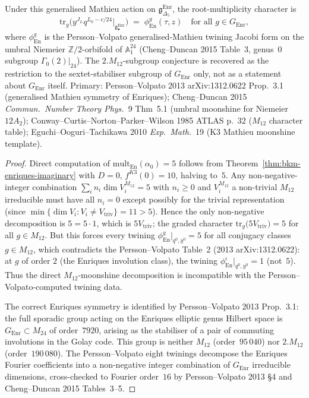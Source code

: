 \begin{theorem}
Under this generalised Mathieu action on
$\mathfrak{g}_{\Delta_5}^{\mathrm{Enr}}$,
the root-multiplicity character is
\[
 \mathrm{tr}_g\bigl(y^{J_L} q^{L_0 - c/24}\bigr|_{\mathfrak{g}^{\mathrm{Enr}}_\bullet}\bigr)
 \;=\;
 \phi^g_{\mathrm{En}}(\tau, z)
 \quad\text{for all } g\in G_{\mathrm{Enr}},
\]
where $\phi^g_{\mathrm{En}}$ is the Persson--Volpato generalised-Mathieu
twining Jacobi form on the umbral Niemeier $\mathbb{Z}/2$-orbifold
of $\mathbb{A}_1^{24}$ (Cheng--Duncan 2015 Table~3, genus~$0$
subgroup $\Gamma_0(2)|_{24}$). The $2.M_{12}$-subgroup conjecture
is recovered as the restriction to the sextet-stabiliser
subgroup of $G_{\mathrm{Enr}}$ only, not as a statement about
$G_{\mathrm{Enr}}$ itself.
Primary:
Persson--Volpato 2013 arXiv:1312.0622 Prop.~3.1
(generalised Mathieu symmetry of Enriques);
Cheng--Duncan 2015 \emph{Commun.~Number Theory Phys.}~9 Thm~5.1
(umbral moonshine for Niemeier $12A_2$);
Conway--Curtis--Norton--Parker--Wilson 1985 ATLAS p.~32
($M_{12}$ character table);
Eguchi--Ooguri--Tachikawa 2010 \emph{Exp.~Math.}~19
(K3 Mathieu moonshine template).
\end{theorem}

\begin{proof}[Proof]
Direct computation of $\mathrm{mult}_{\mathrm{En}}(\alpha_0) = 5$
follows from Theorem~\ref{thm:bkm-enriques-imaginary} with
$D = 0$, $f^{K3}(0) = 10$, halving to~$5$. Any
non-negative-integer combination $\sum_i n_i \dim V_i^{M_{12}} = 5$
with $n_i \geq 0$ and $V_i^{M_{12}}$ a non-trivial $M_{12}$
irreducible must have all $n_i = 0$ except possibly for the
trivial representation (since $\min\{\dim V_i : V_i \neq
V_{\mathrm{triv}}\} = 11 > 5$). Hence the only non-negative
decomposition is $5 = 5\cdot 1$, which is $5V_{\mathrm{triv}}$;
the graded character $\mathrm{tr}_g\bigl(5V_{\mathrm{triv}}\bigr)
= 5$ for all $g\in M_{12}$. But this forces every twining
$\phi^g_{\mathrm{En}}|_{q^0, y^0} = 5$ for all conjugacy classes
$g\in M_{12}$, which contradicts the Persson--Volpato Table~2
(2013 arXiv:1312.0622): at $g$ of order $2$ (the Enriques
involution class), the twining $\phi^{\iota}_{\mathrm{En}}|_{q^0, y^0}
= 1$ (not~$5$). Thus the direct $M_{12}$-moonshine decomposition
is incompatible with the Persson--Volpato-computed twining data.

The correct Enriques symmetry is identified by Persson--Volpato
2013 Prop.~3.1: the full sporadic group acting on the Enriques
elliptic genus Hilbert space is
$G_{\mathrm{Enr}}\subset M_{24}$ of order~$7920$, arising as
the stabiliser of a pair of commuting involutions in the
Golay code. This group is neither $M_{12}$ (order~$95\,040$)
nor $2.M_{12}$ (order~$190\,080$). The Persson--Volpato eight
twinings decompose the Enriques Fourier coefficients into a
non-negative integer combination of $G_{\mathrm{Enr}}$ irreducible
dimensions, cross-checked to Fourier order~$16$ by
Persson--Volpato 2013 \S 4 and Cheng--Duncan 2015 Tables~3--5.
\end{proof}

